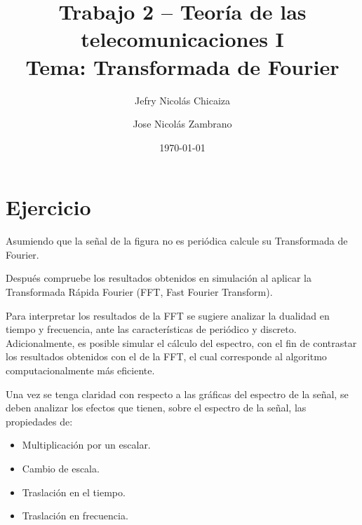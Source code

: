 \documentclass[11pt, twocolumn]{article}
\date{\today}
\title{
    \fontsize{22}{22}\selectfont 
    \textbf{Trabajo 2 -- Teoría de las telecomunicaciones I} \\
    \fontsize{16}{16}\selectfont 
    Tema: Transformada de Fourier
}
\author[1]{Jefry Nicolás Chicaiza}
\author[2]{Jose Nicolás Zambrano}
\affil[1]{jefryn@unicauca.edu.co}
\affil[2]{jnzambranob@unicauca.edu.co}
\date{}
\begin{document}
\maketitle
\thispagestyle{fancy}

\section*{Ejercicio}
Asumiendo que la señal de la figura no es periódica calcule su Transformada de Fourier. 

\begin{figure}[H]
    \centering
\end{figure}

Después compruebe los resultados obtenidos en simulación al aplicar la Transformada Rápida 
Fourier (FFT, Fast Fourier Transform).

Para interpretar los resultados de la FFT se sugiere analizar la dualidad en tiempo y 
frecuencia, ante las características de periódico y discreto. Adicionalmente, es posible 
simular el cálculo del espectro, con el fin de contrastar los resultados obtenidos con 
el de la FFT, el cual corresponde al algoritmo computacionalmente más eficiente.

Una vez se tenga claridad con respecto a las gráficas del espectro de la señal, se 
deben analizar los efectos que tienen, sobre el espectro de la señal, las propiedades 
de:
\begin{itemize}
    \item Multiplicación por un escalar.
    \item Cambio de escala.
    \item Traslación en el tiempo.
    \item Traslación en frecuencia.
\end{itemize}
\end{document}
